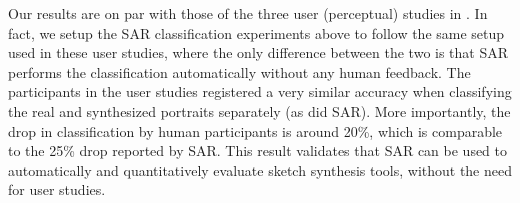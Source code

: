 Our results are on par with those of the three user (perceptual) studies in . In fact, we setup the SAR classification experiments above to follow the same setup used in these user studies, where the only difference between the two is that SAR performs the classification automatically without any human feedback. The participants in the user studies registered a very similar accuracy when classifying the real and synthesized portraits separately (as did SAR). More importantly, the drop in classification by human participants is around 20\%, which is comparable to the 25\% drop reported by SAR. This result validates that SAR can be used to automatically and quantitatively evaluate sketch synthesis tools, without the need for user studies.





